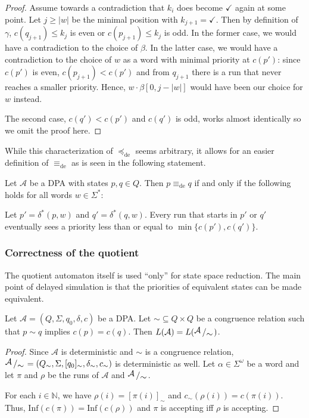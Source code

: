 \begin{proof}
	Assume towards a contradiction that $k_i$ does become $\checkmark$ again at some point. Let $j \geq |w|$ be the minimal position with $k_{j+1} = \checkmark$. Then by definition of $\gamma$, $c(q_{j+1}) \leq k_j$ is even or $c(p_{j+1}) \leq k_j$ is odd. In the former case, we would have a contradiction to the choice of $\beta$. In the latter case, we would have a contradiction to the choice of $w$ as a word with minimal priority at $c(p')$: since $c(p')$ is even, $c(p_{j+1}) < c(p')$ and from $q_{j+1}$ there is a run that never reaches a smaller priority. Hence, $w \cdot \beta[0, j-|w|]$ would have been our choice for $w$ instead.
	
	The second case, $c(q') < c(p')$ and $c(q')$ is odd, works almost identically so we omit the proof here.
\end{proof}

While this characterization of $\preceq_\text{de}$ seems arbitrary, it allows for an easier definition of $\equiv_\text{de}$ as is seen in the following statement.

\begin{cor}
\label{cor:fwe:equivde_alternative}
	Let $\mathcal{A}$ be a DPA with states $p, q \in Q$. Then $p \equiv_\text{de} q$ if and only if the following holds for all words $w \in \Sigma^*$:
	
	Let $p' = \delta^*(p, w)$ and $q' = \delta^*(q, w)$. Every run that starts in $p'$ or $q'$ eventually sees a priority less than or equal to $\min \{c(p'), c(q')\}$.
\end{cor}



\vspace{1cm}
\subsubsection*{Correctness of the quotient}
The quotient automaton itself is used \enquote{only} for state space reduction. The main point of delayed simulation is that the priorities of equivalent states can be made equivalent. 

\begin{theorem}
\label{thm:fritzwilke:congrel_prio_implies_quotient_equal}
	Let $\mathcal{A} = (Q, \Sigma, q_0, \delta, c)$ be a DPA. Let $\sim \subseteq Q \times Q$ be a congruence relation such that $p \sim q$ implies $c(p) = c(q)$. Then $L(\mathcal{A}) = L(\bigslant{\mathcal{A}}{\sim})$.
\end{theorem}

\begin{proof}
	Since $\mathcal{A}$ is deterministic and $\sim$ is a congruence relation, $\bigslant{\mathcal{A}}{\sim} = (Q_\sim, \Sigma, [q_0]_\sim, \delta_\sim, c_\sim)$ is deterministic as well. Let $\alpha \in \Sigma^\omega$ be a word and let $\pi$ and $\rho$ be the runs of $\mathcal{A}$ and $\bigslant{\mathcal{A}}{\sim}$. 
		
	For each $i \in \mathbb{N}$, we have $\rho(i) = [\pi(i)]_\sim$ and $c_\sim(\rho(i)) = c(\pi(i))$. Thus, $\text{Inf}(c(\pi)) = \text{Inf}(c(\rho))$ and $\pi$ is accepting iff $\rho$ is accepting.
\end{proof}

